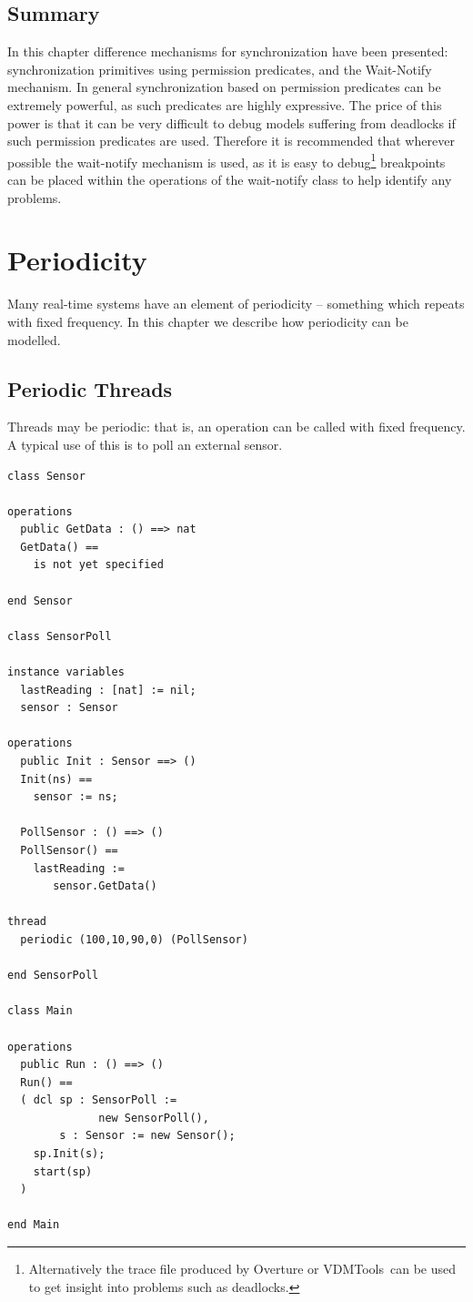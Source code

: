 \documentclass{overturerepchap}
\newcommand{\vdmtools}{VDMTools}
\begin{document}
\section{Summary}

In this chapter difference mechanisms for synchronization have been
presented: synchronization primitives using permission predicates, and
the Wait-Notify mechanism.  In general synchronization based on
permission predicates can be extremely powerful, as such predicates
are highly expressive. The price of this power is that it can be very
difficult to debug models suffering from deadlocks if such permission
predicates are used. Therefore it is recommended that wherever
possible the wait-notify mechanism is used, as it is easy to
debug\footnote{Alternatively the trace file produced by Overture or \vdmtools\
can be used to get insight into problems such as deadlocks.}
breakpoints can be placed within the operations of the wait-notify
class to help identify any problems.


\chapter{Periodicity}\label{chap:period}

Many real-time systems have an element of periodicity -- something
which repeats with fixed frequency. In this chapter we describe how
periodicity can be modelled.

\section{Periodic Threads}\label{sec:periodthread}

Threads may be periodic: that is, an operation can be called with
fixed frequency. A typical use of this is to poll an external sensor.

\begin{lstlisting}
class Sensor

operations
  public GetData : () ==> nat
  GetData() ==
    is not yet specified

end Sensor

class SensorPoll

instance variables
  lastReading : [nat] := nil;
  sensor : Sensor

operations
  public Init : Sensor ==> ()
  Init(ns) ==
    sensor := ns;

  PollSensor : () ==> ()
  PollSensor() ==
    lastReading :=
       sensor.GetData()

thread
  periodic (100,10,90,0) (PollSensor)

end SensorPoll

class Main

operations
  public Run : () ==> ()
  Run() ==
  ( dcl sp : SensorPoll :=
              new SensorPoll(),
        s : Sensor := new Sensor();
    sp.Init(s);
    start(sp)
  )

end Main
\end{lstlisting}
\end{document}
